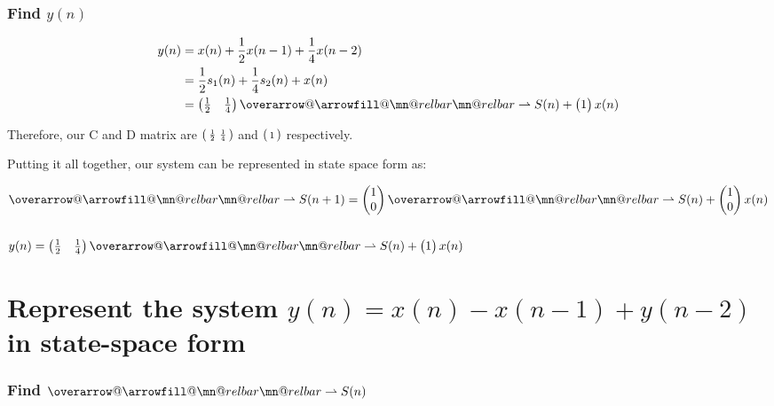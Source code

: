 \documentclass{article}
\makeatletter
\DeclareRobustCommand{\overrightharpoon}{\mathpalette{\overarrow@\rightharpoonfill@}}
\def\rightharpoonfill@{\arrowfill@\mn@relbar\mn@relbar\rightharpoonup}
\makeatother
\begin{document}
\subsubsection{Find $y(n)$}

\begin{align*}
	y(n) &= x(n) + \frac{1}{2}x(n-1) + \frac{1}{4}x(n-2) \\
	&= \frac{1}{2}s_1(n) + \frac{1}{4}s_2(n) + x(n) \\
	&= \begin{pmatrix} \frac{1}{2} & \frac{1}{4} \end{pmatrix}\overrightharpoon{S(n)} + \begin{pmatrix} 1 \end{pmatrix}x(n)
\end{align*}

Therefore, our C and D matrix are $\begin{psmallmatrix} \frac{1}{2} & \frac{1}{4} \end{psmallmatrix}$ and $\begin{psmallmatrix} 1 \end{psmallmatrix}$ respectively.

Putting it all together, our system can be represented in state space form as:

\begin{align*}
	&\overrightharpoon{S(n+1)} = \begin{pmatrix} 1 \\ 0 \end{pmatrix}\overrightharpoon{S(n)} + \begin{pmatrix} 1 \\ 0 \end{pmatrix}x(n) \\ \\
	&y(n) = \begin{pmatrix} \frac{1}{2} & \frac{1}{4} \end{pmatrix}\overrightharpoon{S(n)} + \begin{pmatrix} 1 \end{pmatrix}x(n)
\end{align*}

\section{Represent the system $y(n) = x(n) - x(n-1) + y(n-2)$ in state-space form}

\subsubsection{Find $\overrightharpoon{S(n)}$}
\end{document}
